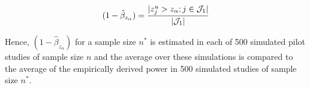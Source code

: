 \begin{equation}
(1-\tilde\beta_{z_\alpha}) = \frac{|z_j^u > z_\alpha; j \in {\cal J}_1|}{|{\cal J}_1|} \nonumber
\end{equation}


Hence, $(1 - \hat\beta_{z_\alpha})$ for a sample size $n^*$ is estimated in each of 500 simulated pilot studies of sample size $n$ and the average over these simulations is compared to the average of the empirically derived power in 500 simulated studies of sample size $n^*$.
